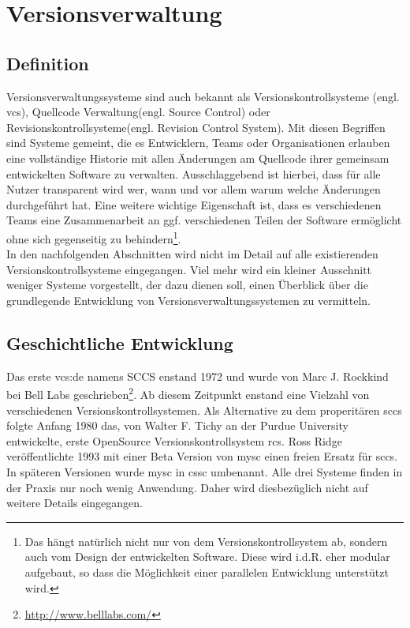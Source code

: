 \chapter{Versionsverwaltung}\label{cha:Versionsverwaltung}
\section{Definition}\label{sec:Definition}
Versionsverwaltungssysteme sind auch bekannt als Versionskontrollsysteme (engl.
\acrlong{vcs}), Quellcode Verwaltung(engl. Source Control) oder
Revisionskontrollsysteme(engl. Revision Control System). Mit diesen Begriffen
sind Systeme gemeint, die es Entwicklern, Teams oder Organisationen erlauben
eine vollständige Historie mit allen Änderungen am Quellcode ihrer gemeinsam
entwickelten Software zu verwalten. Ausschlaggebend ist hierbei, dass für alle
Nutzer transparent wird wer, wann und vor allem warum welche Änderungen
durchgeführt hat. Eine weitere wichtige Eigenschaft ist, dass es verschiedenen
Teams eine Zusammenarbeit an ggf. verschiedenen Teilen der Software ermöglicht
ohne sich gegenseitig zu behindern\footnote{\label{dev:1}Das hängt natürlich
nicht nur von dem Versionskontrollsystem ab, sondern auch vom Design der
entwickelten Software.  Diese wird i.d.R. eher modular aufgebaut, so dass die
Möglichkeit einer parallelen Entwicklung unterstützt wird.}.\cite[S.~381]{cd}\\

In den nachfolgenden Abschnitten wird nicht im Detail auf alle existierenden
Versionskontrollsysteme eingegangen. Viel mehr wird ein kleiner Ausschnitt
weniger Systeme vorgestellt, der dazu dienen soll, einen Überblick über die
grundlegende Entwicklung von Versionsverwaltungssystemen zu vermitteln.

\section{Geschichtliche Entwicklung}\label{sec:GeschichtlicheEntwicklung}
Das erste \gls{vcs:de} namens SCCS enstand 1972 und wurde von Marc J.  Rockkind
bei Bell Labs
geschrieben\footnote{\url{http://www.belllabs.com/}}\cite[S.~382]{cd}. Ab
diesem Zeitpunkt enstand eine Vielzahl von verschiedenen
Versionskontrollsystemen. Als Alternative zu dem properitären \acrshort{sccs}
folgte Anfang 1980 das, von Walter F. Tichy an der Purdue University
entwickelte, erste \acrlong{OpenSource} Versionskontrollsystem
\acrfull{rcs}\cite{paper:rcs,link:rcs}. Ross Ridge veröffentlichte 1993 mit
einer Beta Version von \acrshort{mysc} einen freien Ersatz für \acrshort{sccs}.
In späteren Versionen wurde \acrshort{mysc} in \acrfull{cssc}
umbenannt\cite{link:cssc,link:mysc}. Alle drei Systeme finden in der Praxis nur
noch wenig Anwendung. Daher wird diesbezüglich nicht auf weitere Details
eingegangen.

